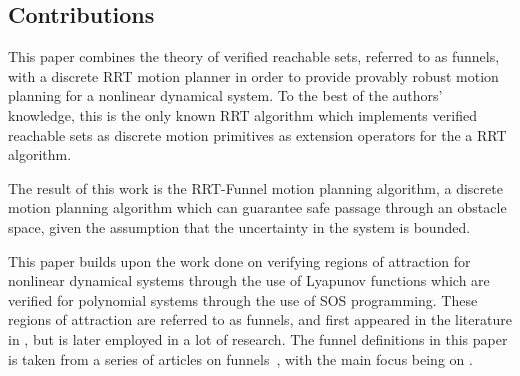 \subsection{Contributions}

This paper combines the theory of verified reachable sets, referred to as
funnels, with a discrete RRT motion planner in order to provide provably robust
motion planning for a nonlinear dynamical system. To the best of the authors'
knowledge, this is the only known RRT algorithm which implements verified
reachable sets as discrete motion primitives as extension operators for the a
RRT algorithm.

The result of this work is the RRT-Funnel motion planning algorithm, a discrete
motion planning algorithm which can guarantee safe passage through an obstacle
space, given the assumption that the uncertainty in the system is bounded.

This paper builds upon the work done on verifying regions of attraction for
nonlinear dynamical systems through the use of Lyapunov functions which are
verified for polynomial systems through the use of SOS programming. These
regions of attraction are referred to as funnels, and first appeared in the
literature in \cite{masonMechanicsManipulation1985}, but is later employed in a
lot of research. The funnel definitions in this paper is taken from a series of
articles on funnels~\cite{Tobenkin_2011,tedrakeLQRtreesFeedbackMotion2009,
  majumdarRobustOnlineMotion2013,
  majumdarFunnelLibrariesRealtime2017,ahmadi2014dsos}, with the main focus being
on \cite{majumdarFunnelLibrariesRealtime2017}.
